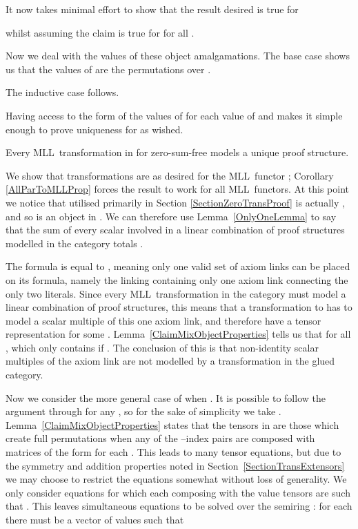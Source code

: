 \documentclass{LMCS}
\theoremstyle{plain}\newtheorem*{cLm}{Claim}
\newcommand{\mll}{MLL} \newcommand{\mall}{MALL}
\newcommand{\p}{} \newcommand{\N}{\mathbb{N}}
\begin{document}
    It now takes minimal effort to show that the result desired is true for
    
    whilst assuming the claim is true for  for all .
    
    
    Now we deal with the values of these object amalgamations. The base case shows us that the values of  are the permutations over .
    
    The inductive case follows.
    \smallskip
    
\noindent    Having access to the form of the values of  for each value of  and  makes it simple enough to prove uniqueness for  as wished.
    
    \begin{prop} \label{MixUniqueLemma}
    Every \mll~transformation in  for zero-sum-free  models a unique proof structure.
    \end{prop}
    \proof
    We show that transformations are as desired for the \mll~functor ; Corollary \ref{AllParToMLLProp} forces the result to work for all \mll~functors.  At this point we notice that  utilised primarily in Section \ref{SectionZeroTransProof} is actually , and so is an object in . We can therefore use Lemma~\ref{OnlyOneLemma} to say that the sum of every scalar involved in a linear combination of proof structures modelled in the category totals .
    
    \p The formula  is equal to , meaning only one valid set of axiom links can be placed on its formula, namely the linking containing only one axiom link connecting the only two literals. Since every \mll~transformation in the category must model a linear combination of proof structures, this means that a transformation to  has to model a scalar multiple of this one axiom link, and therefore have a tensor representation  for some . Lemma~\ref{ClaimMixObjectProperties} tells us that  for all , which only contains  if . The conclusion of this is that non-identity scalar multiples of the axiom link are not modelled by a transformation in the glued category.
    
    \p Now we consider the more general case of when . It is possible to follow the argument through for any , so for the sake of simplicity we take . Lemma~\ref{ClaimMixObjectProperties} states that the tensors in  are those which create full permutations when any  of the  --index pairs are composed with matrices of the form  for each . This leads to many tensor equations, but due to the symmetry and addition properties noted in Section~\ref{SectionTransExtensors} we may choose to restrict the equations somewhat without loss of generality. We only consider equations for which each  composing with the value tensors are such that . This leaves  simultaneous equations to be solved over the semiring : for each  there must be a vector of values  such that
    
\end{document}

